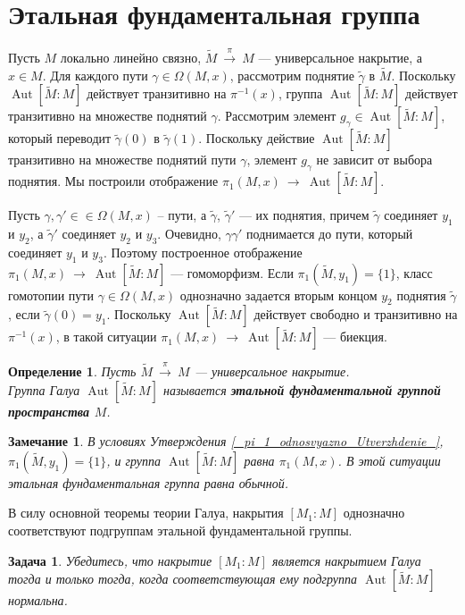 \documentclass[12pt]{book}
\newcommand{\arrow}{{\:\longrightarrow\:}}
\def\Aut{\operatorname{Aut}}
\theoremstyle{upshape}
\newtheorem{zadacha}{Задача}[chapter]
\theoremstyle{generic}
\newtheorem{opredelenie}[teorema]{Определение}
\newtheorem{remark}[teorema]{Замечание}
\def\замечание{\begin{remark}}
\def\еза{\end{remark}}
\theoremstyle{upshapenonumber}
\newcommand{\следствие}{%
     \refstepcounter{teorema}
     {\noindent\bf Следствие \thechapter.\arabic{teorema}:\ }}
\newcommand{\пример}{%
     \refstepcounter{teorema}
     {\noindent\bf Пример \thechapter.\arabic{teorema}:\ }}
\newcommand{\лемма}{%
     \refstepcounter{teorema}
     {\noindent\bf Лемма \thechapter.\arabic{teorema}:\ }}
\newcommand{\теорема}{%
     \refstepcounter{teorema}
     {\noindent\bf Теорема \thechapter.\arabic{teorema}:\ }}
\newcommand{\утверждение}{%
     \refstepcounter{teorema}
     {\noindent\bf Утверждение \thechapter.\arabic{teorema}:\ }}
\def\бф{\bf}
\def\ем{\em}
\def\задача{\begin{zadacha}}
\def\ез{\end{zadacha}}
\def\еу{\end{ukazanie}}
\def\определение{\begin{opredelenie}}
\def\ео{\end{opredelenie}}
\def\енум{\begin{enumerate}}
\def\ее{\end{enumerate}}
\begin{document}

\section{Этальная фундаментальная группа}



Пусть $M$ локально линейно связно, $\tilde M \stackrel
\pi\arrow M$ --- универсальное накрытие, а $x\in M$.
Для каждого пути $\gamma \in \Omega(M,x)$,
рассмотрим поднятие $\tilde \gamma$ в $\tilde M$.
Поскольку $\Aut[\tilde M:M]$ действует транзитивно
на $\pi^{-1}(x)$, группа $\Aut[\tilde M:M]$
действует транзитивно на множестве поднятий
$\gamma$. Рассмотрим элемент $g_\gamma \in \Aut[\tilde M:M]$,
который переводит $\tilde\gamma(0)$ в $\tilde \gamma(1)$.
Поскольку действие $\Aut[\tilde M:M]$  транзитивно
на множестве поднятий пути $\gamma$, элемент 
$g_\gamma$ не зависит от выбора поднятия.
Мы построили отображение $\pi_1(M,x) \arrow \Aut[\tilde M:M]$.

Пусть $\gamma, \gamma'\in  \in \Omega(M,x)$ --
пути, а $\tilde \gamma$, $\tilde \gamma'$ --- их
поднятия, причем $\tilde \gamma$ соединяет
$y_1$ и $y_2$, а $\tilde \gamma'$ соединяет
$y_2$ и $y_3$. Очевидно, $\gamma\gamma'$ поднимается
до пути, который соединяет $y_1$ и $y_3$.
Поэтому построенное отображение 
$\pi_1(M,x) \arrow \Aut[\tilde M:M]$ --- гомоморфизм.
Если $\pi_1(\tilde M,y_1)=\{1\}$,
класс гомотопии пути $\gamma \in \Omega(M,x)$
однозначно задается вторым концом $y_2$
поднятия $\tilde\gamma$, если $\tilde\gamma(0)=y_1$.
Поскольку $\Aut[\tilde M:M]$ действует свободно
и транзитивно на $\pi^{-1}(x)$, в такой ситуации 
$\pi_1(M,x) \arrow \Aut[\tilde M:M]$ --- биекция.

\определение
Пусть $\tilde M \stackrel
\pi\arrow M$ --- универсальное накрытие. \\
Группа Галуа $\Aut[\tilde M:M]$ называется {\бф этальной фундаментальной
группой пространства $M$}. 
\ео

\замечание
В условиях Утверждения \ref{_pi_1_odnosvyazno_Utverzhdenie_},
$\pi_1(\tilde M,y_1)=\{1\}$, и группа $\Aut[\tilde M:M]$ равна
$\pi_1(M,x)$. В этой ситуации этальная фундаментальная
группа равна обычной.
\еза

В силу основной теоремы теории Галуа,
накрытия $[M_1:M]$ однозначно соответствуют
подгруппам этальной фундаментальной группы.


\задача
Убедитесь, что накрытие $[M_1:M]$
является накрытием Галуа тогда и только тогда, когда
соответствующая ему подгруппа $\Aut[\tilde M:M]$ нормальна.
\ез
\end{document}
